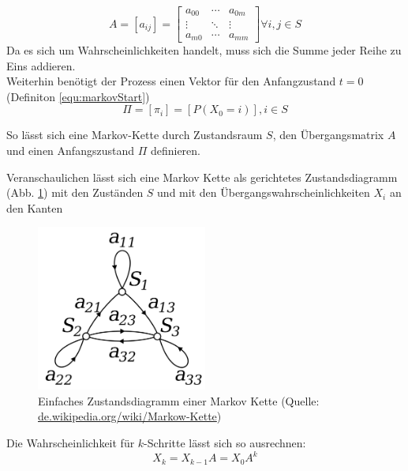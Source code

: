 \begin{equation}
\label{equ:markovTrans}
A = [a_{ij}] =
\begin {bmatrix} 
  a_{00}&\cdots&a_{0m} \\
  \vdots&\ddots&\vdots \\
  a_{m0}&\cdots&a_{mm}
 \end {bmatrix} \forall i, j \in S
\end{equation}
Da es sich um Wahrscheinlichkeiten handelt, muss sich die Summe jeder Reihe zu Eins addieren. \\

Weiterhin benötigt der Prozess einen Vektor für den Anfangzustand $t = 0$ (Definiton \ref{equ:markovStart})
\begin{equation}
 \label{equ:markovStart}
 \Pi = [ \pi_i] = [ P (X_0 = i) ] , i \in S
\end{equation}

So lässt sich eine Markov-Kette durch Zustandsraum \(S\), den Übergangsmatrix \( A \) und einen Anfangszustand \( \Pi \) definieren.

Veranschaulichen lässt sich eine Markov Kette als gerichtetes Zustandsdiagramm (Abb. \ref{fig:simple_mc}) mit den Zuständen \(S\) und 
mit den Übergangswahrscheinlichkeiten \(X_i\) an den Kanten
\begin{figure}[htbp] \centering
    \includegraphics[width=0.5\textwidth]{Bilder/Kap2/simple_mc.png}
    \caption{Einfaches Zustandsdiagramm einer Markov Kette (Quelle: \url{de.wikipedia.org/wiki/Markow-Kette})}
    \label{fig:simple_mc}
\end{figure}

Die Wahrscheinlichkeit für \( k \)-Schritte lässt sich so ausrechnen: 
\[ X_k = X_{k-1} A = X_0 A^k \] 
